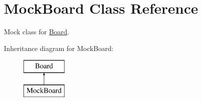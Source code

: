 \hypertarget{classMockBoard}{}\section{Mock\+Board Class Reference}
\label{classMockBoard}


Mock class for \mbox{\hyperlink{classBoard}{Board}}.  


Inheritance diagram for Mock\+Board\+:\begin{figure}[H]
\begin{center}
\leavevmode
\includegraphics[height=2.000000cm]{classMockBoard}
\end{center}
\end{figure}
